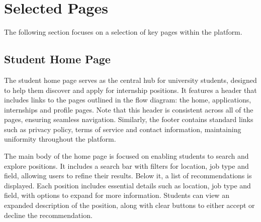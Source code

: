 \section{Selected Pages}
The following section focuses on a selection of key pages within the platform.

\newpage
\subsection{Student Home Page}
The student home page serves as the central hub for university students, designed to help them discover and apply for internship positions.
It features a header that includes links to the pages outlined in the flow diagram: the home, applications, internships and profile pages.
Note that this header is consistent across all of the pages, ensuring seamless navigation.
Similarly, the footer contains standard links such as privacy policy, terms of service and contact information, maintaining uniformity throughout the platform.

The main body of the home page is focused on enabling students to search and explore positions.
It includes a search bar with filters for location, job type and field, allowing users to refine their results.
Below it, a list of recommendations is displayed.
Each position includes essential details such as location, job type and field, with options to expand for more information.
Students can view an expanded description of the position, along with clear buttons to either accept or decline the recommendation.

